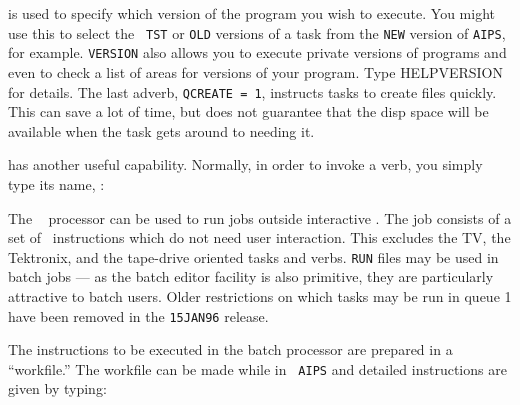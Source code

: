      {\tt {}} is used to specify which version of the
program you wish to execute.  You might use this to select the {\tt
TST} or {\tt OLD} versions of a task from the {\tt NEW} version of
{\tt AIPS}, for example. {\tt VERSION} also allows you to execute
private versions of programs and even to check a list of areas for
versions of your program.  Type {\us HELP\qs VERSION \CR} for details.
The last adverb, {\tt QCREATE = 1}, instructs tasks to create files
quickly.  This can save a lot of time, but does not guarantee that the
disp space will be available when the task gets around to needing it.

     {\tt {}} has another useful capability.  Normally, in
order to invoke a verb, you simply type its name, \eg:


     The \AIPS\  processor can be used to run jobs outside
interactive \AIPS\@.  The job consists of a set of \AIPS\ instructions
which do not need user interaction.  This excludes the TV, the
Tektronix, and the tape-drive oriented tasks and verbs.  {\tt RUN}
files may be used in batch jobs --- as the batch editor facility
is also primitive, they are particularly attractive to batch users.
Older restrictions on which tasks may be run in queue 1 have been
removed in the {\tt 15JAN96} release.

     The instructions to be executed in the batch processor are
prepared in a ``workfile.''  The workfile can be made while in {\tt
AIPS} and detailed instructions are given by typing:
\pd

